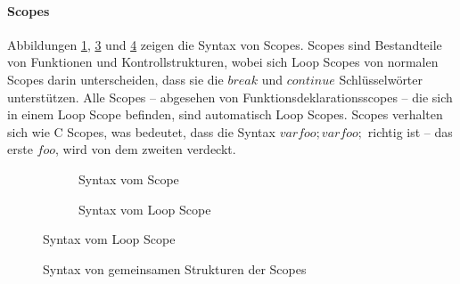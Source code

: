       \paragraph{Scopes}
        Abbildungen \ref{fig:scopesyntax}, \ref{fig:loopscopesyntax} und \ref{fig:commonsyntax} zeigen die Syntax von Scopes. Scopes sind Bestandteile von Funktionen und Kontrollstrukturen, wobei sich Loop Scopes von normalen Scopes darin unterscheiden, dass sie die \myMIn$break$ und \myMIn$continue$ Schlüsselwörter unterstützen. Alle Scopes -- abgesehen von Funktionsdeklarationsscopes -- die sich in einem Loop Scope befinden, sind automatisch Loop Scopes. Scopes verhalten sich wie C Scopes, was bedeutet, dass die Syntax \myMIn$var foo; {var foo;}$ richtig ist -- das erste \myMIn$foo$, wird von dem zweiten verdeckt.
        \begin{figure}[H]
          \vspace*{-\baselineskip}
          \centering
          \begin{minipage}{.45\linewidth}
            \vspace*{4.8em}
            \begin{figure}[H]
              \centering
              \caption{Syntax vom Scope}
              \label{fig:scopesyntax}
            \end{figure}
          \end{minipage}%
          \begin{minipage}{.45\linewidth}
            \begin{figure}[H]
              \centering
              \caption{Syntax vom Loop Scope}
              \label{fig:loopscopesyntax}
            \end{figure}
          \end{minipage}
        \end{figure}

        \begin{figure}[H]
          \centering
          \caption{Syntax von gemeinsamen Strukturen der Scopes}
          \label{fig:commonsyntax}
        \end{figure}

